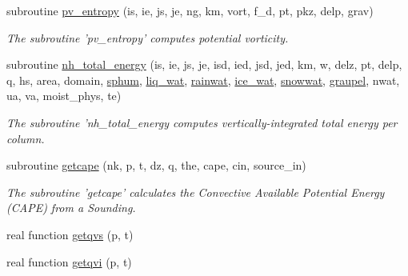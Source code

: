 \begin{DoxyCompactItemize}
\item 
subroutine \hyperlink{classfv__diagnostics__mod_a2a15d1b4b89fddd2252c2f7d60f95d74}{pv\-\_\-entropy} (is, ie, js, je, ng, km, vort, f\-\_\-d, pt, pkz, delp, grav)
\begin{DoxyCompactList}\small\item\em The subroutine 'pv\-\_\-entropy' computes potential vorticity. \end{DoxyCompactList}\item 
subroutine \hyperlink{classfv__diagnostics__mod_a1d0690809b1cbd817c3ce397c5580ae6}{nh\-\_\-total\-\_\-energy} (is, ie, js, je, isd, ied, jsd, jed, km, w, delz, pt, delp, q, hs, area, domain, \hyperlink{classfv__diagnostics__mod_a60dad9285aa4277546ef49434b1d9362}{sphum}, \hyperlink{classfv__diagnostics__mod_a338a3f41be9414e9ec7ab618e5c451f7}{liq\-\_\-wat}, \hyperlink{classfv__diagnostics__mod_a732b3c99ea8fce56be8203d5f7c4967e}{rainwat}, \hyperlink{classfv__diagnostics__mod_af189fa9869405f3888a1f2134dd03f3f}{ice\-\_\-wat}, \hyperlink{classfv__diagnostics__mod_ab584717500f6b11a4e8e05004fa67eb2}{snowwat}, \hyperlink{classfv__diagnostics__mod_abaf055458b50aae94a987c4310f35a5e}{graupel}, nwat, ua, va, moist\-\_\-phys, te)
\begin{DoxyCompactList}\small\item\em The subroutine 'nh\-\_\-total\-\_\-energy computes vertically-\/integrated total energy per column. \end{DoxyCompactList}\item 
subroutine \hyperlink{classfv__diagnostics__mod_aec5d8b938b5c6c212ddbd1fc57b8ec17}{getcape} (nk, p, t, dz, q, the, cape, cin, source\-\_\-in)
\begin{DoxyCompactList}\small\item\em The subroutine 'getcape' calculates the Convective Available Potential Energy (C\-A\-P\-E) from a Sounding. \end{DoxyCompactList}\item 
real function \hyperlink{classfv__diagnostics__mod_ab6961d77cefdf63e272ce2397c2cd13d}{getqvs} (p, t)
\item 
real function \hyperlink{classfv__diagnostics__mod_aa433db31ad332206029a7365b007ba14}{getqvi} (p, t)
\end{DoxyCompactItemize}
